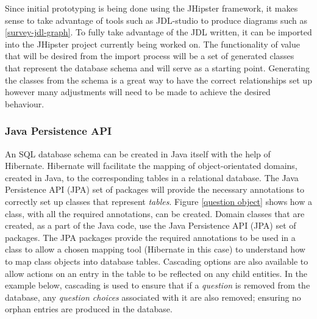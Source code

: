 Since initial prototyping is being done using the JHipster framework, it makes sense to take advantage of tools such as 
JDL-studio to produce diagrams such as \ref{survey-jdl-graph}.
To fully take advantage of the JDL written, it can be imported into the JHipster project currently being worked on. 
The functionality of value that will be desired from the import process will be a set of generated classes that represent
the database schema and will serve as a starting point.
Generating the classes from the schema is a great way to have the correct relationships set up however many adjustments will
need to be made to achieve the desired behaviour.

\subsubsection{Java Persistence API}
An SQL database schema can be created in Java itself with the help of Hibernate. %
Hibernate will facilitate the mapping of object-orientated domains, created in Java, to the corresponding tables in a relational database.
The Java Persistence API (JPA) set of packages will provide the necessary annotations to correctly set up classes that represent \textit{tables}.
Figure \ref{question object} shows how a class, with all the required annotations, can be created.
Domain classes that are created, as a part of the Java code, use the Java Persistence API (JPA) set of packages.
The JPA packages provide the required annotations to be used in a class to allow a chosen mapping tool (Hibernate in this case) to understand how
to map class objects into database tables.
Cascading options are also available to allow actions on an entry in the table to be reflected on any child entities.
In the example below, cascading is used to ensure that if a \textit{question} is removed from the database, any \textit{question choices} associated
with it are also removed; ensuring no orphan entries are produced in the database.

